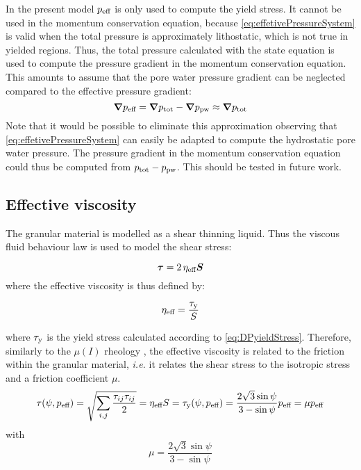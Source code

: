 \documentclass{../GPUSPHtemplate}
\begin{document}
In the present model $p_{\text{eff}}$ is only used to compute the yield stress. It cannot be used in the momentum conservation equation, because \eqref{eq:effetivePressureSystem} is valid when the total pressure is approximately lithostatic, which is not true in yielded regions. Thus, the total pressure calculated with the state equation is used to compute the pressure gradient in the momentum conservation equation. This amounts to assume that the pore water pressure gradient can be neglected compared to the effective pressure gradient:
\begin{equation}
\bm{\nabla} p_{\text{eff}} = \bm{\nabla} p_{\text{tot}} - \bm{\nabla} p_{\text{pw}} \approx \bm{\nabla} p_{\text{tot}}
\end{equation}
%
Note that it would be possible to eliminate this approximation observing that \eqref{eq:effetivePressureSystem} can easily be adapted to compute the hydrostatic pore water pressure. The pressure gradient in the momentum conservation equation could thus be computed from $p_{\text{tot}}-p_{\text{pw}}$. This should be tested in future work.

\subsection{Effective viscosity}
The granular material is modelled as a shear thinning liquid. Thus the viscous fluid behaviour law is used to model the shear stress:

\begin{equation}
\bm{\tau} = 2 \, \eta_{\text{eff}} \bm{S}
\label{eq:fluidStressTensor}
\end{equation}
where the effective viscosity is thus defined by:

\begin{equation}
\eta_{\text{eff}} = \dfrac{\tau_{\text{y}}}{S}
\label{eq:effectiveViscosity}
\end{equation}

where $\tau_{\text{y}}$ is the yield stress calculated according to \eqref{eq:DPyieldStress}. Therefore, similarly to the $\mu(I)$ rheology \citep{jop2006constitutive,revil2013two}, the effective viscosity is related to the friction within the granular material, \textit{i.e.} it relates the shear stress to the isotropic stress and a friction coefficient $\mu$.
\begin{equation}
\tau (\psi, p_{\text{eff}}) = \sqrt{\sum\limits_{i,j} \dfrac{\tau_{ij}\tau_{ij}}{2}} 
= \eta_{\text{eff}} S
= \tau_{\text{y}}(\psi, p_{\text{eff}}) = \dfrac{2 \sqrt{3} \sin \psi}{3-\sin \psi} p_{\text{eff}}
=\mu p_{\text{eff}} 
\end{equation}
%
with
%
\begin{equation}
\mu = \dfrac{2 \sqrt{3} \sin \psi}{3-\sin \psi}
\end{equation}
\end{document}

